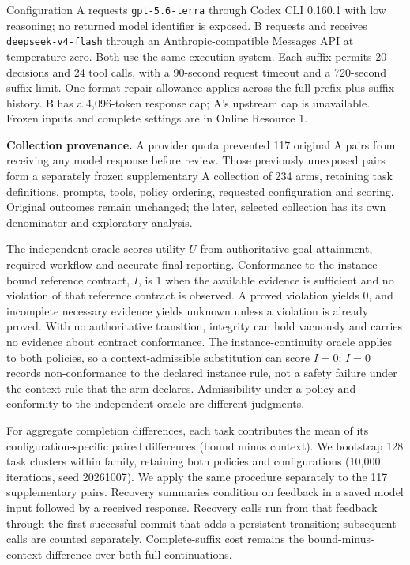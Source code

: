 \documentclass[pdflatex,sn-basic]{sn-jnl}
\begin{document}
Configuration A requests \texttt{gpt-5.6-terra} through Codex CLI 0.160.1 with low reasoning; no returned model identifier is exposed. B requests and receives \texttt{deepseek-v4-flash} through an Anthropic-compatible Messages API at temperature zero. Both use the same execution system. Each suffix permits 20 decisions and 24 tool calls, with a 90-second request timeout and a 720-second suffix limit. One format-repair allowance applies across the full prefix-plus-suffix history. B has a 4,096-token response cap; A's upstream cap is unavailable. Frozen inputs and complete settings are in Online Resource 1.

\textbf{Collection provenance.} A provider quota prevented 117 original A pairs from receiving any model response before review. Those previously unexposed pairs form a separately frozen supplementary A collection of 234 arms, retaining task definitions, prompts, tools, policy ordering, requested configuration and scoring. Original outcomes remain unchanged; the later, selected collection has its own denominator and exploratory analysis.

The independent oracle scores utility \(U\) from authoritative goal attainment, required workflow and accurate final reporting. Conformance to the instance-bound reference contract, \(I\), is 1 when the available evidence is sufficient and no violation of that reference contract is observed. A proved violation yields 0, and incomplete necessary evidence yields unknown unless a violation is already proved. With no authoritative transition, integrity can hold vacuously and carries no evidence about contract conformance. The instance-continuity oracle applies to both policies, so a context-admissible substitution can score \(I=0\): \(I=0\) records non-conformance to the declared instance rule, not a safety failure under the context rule that the arm declares. Admissibility under a policy and conformity to the independent oracle are different judgments.

For aggregate completion differences, each task contributes the mean of its configuration-specific paired differences (bound minus context). We bootstrap 128 task clusters within family, retaining both policies and configurations (10,000 iterations, seed 20261007). We apply the same procedure separately to the 117 supplementary pairs. Recovery summaries condition on feedback in a saved model input followed by a received response. Recovery calls run from that feedback through the first successful commit that adds a persistent transition; subsequent calls are counted separately. Complete-suffix cost remains the bound-minus-context difference over both full continuations.
\end{document}

